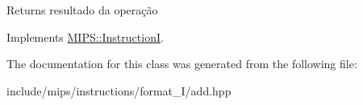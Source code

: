 \begin{DoxyReturn}{Returns}
resultado da operação 
\end{DoxyReturn}


Implements \hyperlink{classMIPS_1_1InstructionI_ae60fca5801bf5415cdff06d2aa11764f}{M\+I\+P\+S\+::\+InstructionI}.



The documentation for this class was generated from the following file\+:\begin{DoxyCompactItemize}
\item 
include/mips/instructions/format\+\_\+\+I/add.\+hpp\end{DoxyCompactItemize}
